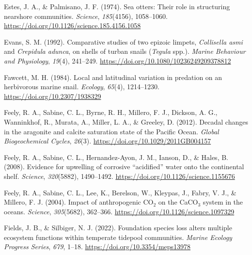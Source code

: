 \documentclass{CSUNthesis}
\begin{document}
\vspace{0.1em}

Estes, J. A., \& Palmisano, J. F. (1974). Sea otters: Their role in structuring nearshore communities. \textit{Science}, \textit{185}(4156), 1058--1060. \url{https://doi.org/10.1126/science.185.4156.1058}

\vspace{0.1em}

Evans, S. M. (1992). Comparative studies of two epizoic limpets, \textit{Collisella asmi} and \textit{Crepidula adunca}, on shells of turban snails (\textit{Tegula} spp.). \textit{Marine Behaviour and Physiology}, \textit{19}(4), 241--249. \url{https://doi.org/10.1080/10236249209378812}

\vspace{0.1em}

Fawcett, M. H. (1984). Local and latitudinal variation in predation on an herbivorous marine snail. \textit{Ecology}, \textit{65}(4), 1214--1230. \url{https://doi.org/10.2307/1938329}

\vspace{0.1em}

Feely, R. A., Sabine, C. L., Byrne, R. H., Millero, F. J., Dickson, A. G., Wanninkhof, R., Murata, A., Miller, L. A., \& Greeley, D. (2012). Decadal changes in the aragonite and calcite saturation state of the Pacific Ocean. \textit{Global Biogeochemical Cycles}, \textit{26}(3). \url{https://doi.org/10.1029/2011GB004157}

\vspace{0.1em}

Feely, R. A., Sabine, C. L., Hernandez-Ayon, J. M., Ianson, D., \& Hales, B. (2008). Evidence for upwelling of corrosive ``acidified'' water onto the continental shelf. \textit{Science}, \textit{320}(5882), 1490--1492. \url{https://doi.org/10.1126/science.1155676}

\vspace{0.1em}

Feely, R. A., Sabine, C. L., Lee, K., Berelson, W., Kleypas, J., Fabry, V. J., \& Millero, F. J. (2004). Impact of anthropogenic CO\(_2\) on the CaCO\(_3\) system in the oceans. \textit{Science}, \textit{305}(5682), 362--366. \url{https://doi.org/10.1126/science.1097329}

\vspace{0.1em}

Fields, J. B., \& Silbiger, N. J. (2022). Foundation species loss alters multiple ecosystem functions within temperate tidepool communities. \textit{Marine Ecology Progress Series}, \textit{679}, 1--18. \url{https://doi.org/10.3354/meps13978}
\end{document}

